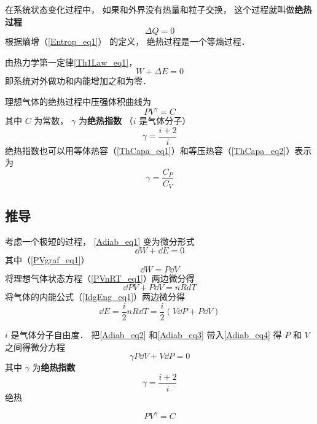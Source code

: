 

在系统状态变化过程中， 如果和外界没有热量和粒子交换， 这个过程就叫做\textbf{绝热过程}
\begin{equation}
\Delta Q = 0
\end{equation}
根据熵增（\autoref{Entrop_eq1}） 的定义， 绝热过程是一个等熵过程．

由热力学第一定律\autoref{Th1Law_eq1}，
\begin{equation}\label{Adiab_eq1}
W + \Delta E = 0
\end{equation}
即系统对外做功和内能增加之和为零．

理想气体的绝热过程中压强体积曲线为
\begin{equation}
P V^\gamma = C
\end{equation}
其中 $C$ 为常数， $\gamma$ 为\textbf{绝热指数} （$i$ 是气体分子）
\begin{equation}
\gamma = \frac{i+2}{i}
\end{equation}
绝热指数也可以用等体热容（\autoref{ThCapa_eq1}）和等压热容（\autoref{ThCapa_eq2}）表示为
\begin{equation}
\gamma = \frac{C_P}{C_V}
\end{equation}

\subsection{推导}
考虑一个极短的过程， \autoref{Adiab_eq1} 变为微分形式
\begin{equation}\label{Adiab_eq4}
\dd{W} + \dd{E} = 0
\end{equation}
其中（\autoref{PVgraf_eq1}）
\begin{equation}\label{Adiab_eq2}
\dd{W} = P\dd{V}
\end{equation}
将理想气体状态方程（\autoref{PVnRT_eq1}）两边微分得
\begin{equation}
\dd{P}V + P\dd{V} = nRdT
\end{equation}
将气体的内能公式（\autoref{IdgEng_eq1}）两边微分得
\begin{equation}\label{Adiab_eq3}
\dd{E} = \frac{i}{2}n R\dd{T} = \frac{i}{2} (V\dd{P} + P\dd{V})
\end{equation}


$i$ 是气体分子自由度． 把\autoref{Adiab_eq2} 和\autoref{Adiab_eq3} 带入\autoref{Adiab_eq4} 得 $P$ 和 $V$ 之间得微分方程
\begin{equation}
\gamma P\dd{V} + V \dd{P} = 0
\end{equation}
其中 $\gamma$ 为\textbf{绝热指数}
\begin{equation}
\gamma = \frac{i+2}{i}
\end{equation}
绝热

\begin{equation}
P V^\gamma = C
\end{equation}
